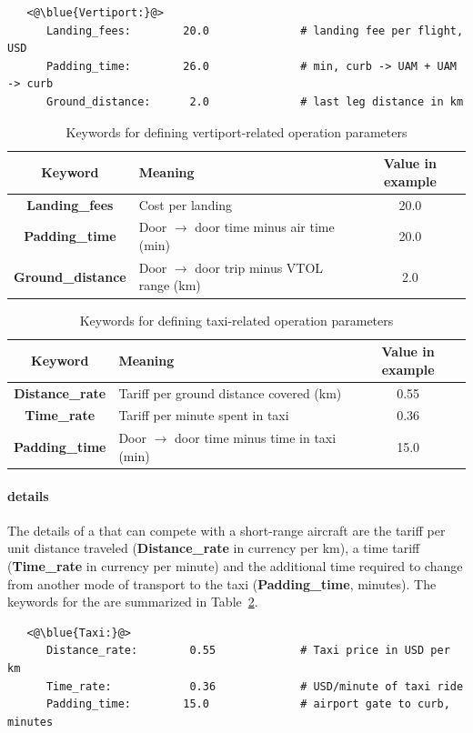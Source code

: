 \begin{lstlisting}
   <@\blue{Vertiport:}@>
      Landing_fees:        20.0              # landing fee per flight, USD
      Padding_time:        26.0              # min, curb -> UAM + UAM -> curb 
      Ground_distance:      2.0              # last leg distance in km
\end{lstlisting}

\begin{table}[H]
\begin{center}
	\caption{Keywords for defining vertiport-related operation parameters}
	\label{tbl:vertiport_keywords}
    \begin{tabular}{| c | l | c |}
    \hline
    Keyword & Meaning & Value in example \\ 
    \hline
\textbf{Landing\_fees} & Cost per landing &  20.0 \\
\textbf{Padding\_time} & Door $\rightarrow$ door time minus air time (min) &  20.0 \\
\textbf{Ground\_distance} & Door $\rightarrow$ door trip minus VTOL range (km) &  2.0 \\
\hline
  \end{tabular}
\end{center}
\end{table}

\begin{table}[H]
\begin{center}
	\caption{Keywords for defining taxi-related operation parameters}
	\label{tbl:taxi_keywords}
    \begin{tabular}{| c | l | c |}
    \hline
    Keyword & Meaning & Value in example \\ 
    \hline
\textbf{Distance\_rate} & Tariff per ground distance covered (km) &  0.55 \\
\textbf{Time\_rate} & Tariff per minute spent in taxi &  0.36 \\
\textbf{Padding\_time} & Door $\rightarrow$ door time minus time in taxi (min) &  15.0 \\
\hline
  \end{tabular}
\end{center}
\end{table}
\vspace{-1.5cm}
\paragraph{ details}
The details of a  that can compete with a short-range aircraft are the tariff per unit distance traveled (\textbf{Distance\_rate} in currency per km), a time tariff (\textbf{Time\_rate} in currency per minute) and the additional time required to change from another mode of transport to the taxi (\textbf{Padding\_time}, minutes). The keywords for the  are summarized in Table~\ref{tbl:taxi_keywords}.
\begin{lstlisting}
   <@\blue{Taxi:}@>
      Distance_rate:        0.55             # Taxi price in USD per km 
      Time_rate:            0.36             # USD/minute of taxi ride
      Padding_time:        15.0              # airport gate to curb, minutes
\end{lstlisting}


